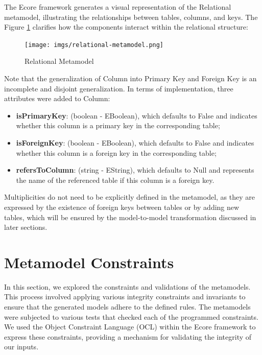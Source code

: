 \documentclass[10pt]{article}
\begin{document}
The Ecore framework generates a visual representation of the Relational metamodel, illustrating the relationships between tables, columns, and keys. The Figure \ref{figure4} clarifies how the components interact within the relational structure:

\begin{center}
    \begin{figure}[H]
        \centering
        \texttt{[image: imgs/relational-metamodel.png]}
            \caption{Relational Metamodel}
        \label{figure4}
    \end{figure}
\end{center}

Note that the generalization of Column into Primary Key and Foreign Key is an incomplete and disjoint generalization. In terms of implementation, three attributes were added to Column:

\begin{itemize}

    \item \textbf{isPrimaryKey}: (boolean - EBoolean), which defaults to False and indicates whether this column is a primary key in the corresponding table;
 
    \item \textbf{isForeignKey}: (boolean - EBoolean), which defaults to False and indicates whether this column is a foreign key in the corresponding table;
    
    \item \textbf{refersToColumn}: (string - EString), which defaults to Null and represents the name of the referenced table if this column is a foreign key.
    
\end{itemize}

Multiplicities do not need to be explicitly defined in the metamodel, as they are expressed by the existence of foreign keys between tables or by adding new tables, which will be ensured by the model-to-model transformation discussed in later sections.

\section{Metamodel Constraints}

In this section, we explored the constraints and validations of the metamodels. This process involved applying various integrity constraints and invariants to ensure that the generated models adhere to the defined rules. The metamodels were subjected to various tests that checked each of the programmed constraints. We used the Object Constraint Language (OCL) within the Ecore framework to express these constraints, providing a mechanism for validating the integrity of our inputs.
\end{document}

